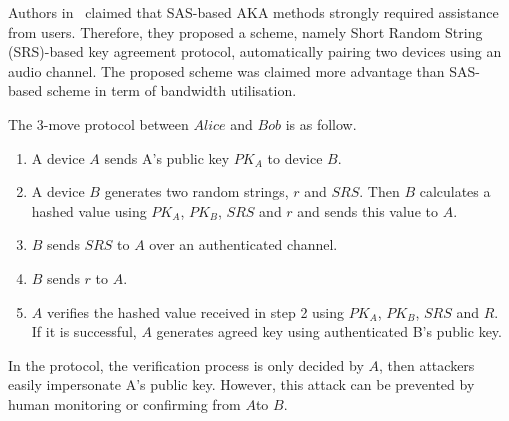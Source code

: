 Authors in~\cite{5678019} claimed that SAS-based AKA methods strongly required assistance from users. Therefore, they proposed a scheme, namely Short Random String (SRS)-based key agreement protocol, automatically pairing two devices using an audio channel. The proposed scheme was claimed more advantage than SAS-based scheme in term of bandwidth utilisation. 

The 3-move protocol between $Alice$ and $Bob$ is as follow.
\begin{enumerate}
\item A device $A$ sends A's public key $PK_A$ to device $B$.
\item A device $B$ generates two random strings, $r$ and $SRS$. Then $B$ calculates a hashed value using $PK_A$, $PK_B$, $SRS$ and $r$ and sends this value to $A$.
\item $B$ sends $SRS$ to $A$ over an authenticated channel. 
\item $B$ sends $r$ to $A$.
\item $A$ verifies the hashed value received in step 2 using $PK_A$, $PK_B$, $SRS$ and $R$. If it is successful, $A$ generates agreed key using authenticated B's public key. 
\end{enumerate}

In the protocol, the verification process is only decided by $A$, then attackers easily impersonate A's public key. However, this attack can be prevented by human monitoring or confirming from $A$to $B$. 

\begin{center}
\end{center} 

